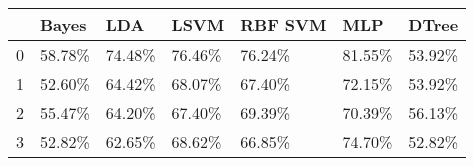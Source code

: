 \begin{tabular}{lllllll}
\toprule
{} &   Bayes &     LDA &    LSVM & RBF SVM &     MLP &   DTree \\
\midrule
0 &  58.78\% &  74.48\% &  76.46\% &  76.24\% &  81.55\% &  53.92\% \\
1 &  52.60\% &  64.42\% &  68.07\% &  67.40\% &  72.15\% &  53.92\% \\
2 &  55.47\% &  64.20\% &  67.40\% &  69.39\% &  70.39\% &  56.13\% \\
3 &  52.82\% &  62.65\% &  68.62\% &  66.85\% &  74.70\% &  52.82\% \\
\bottomrule
\end{tabular}

